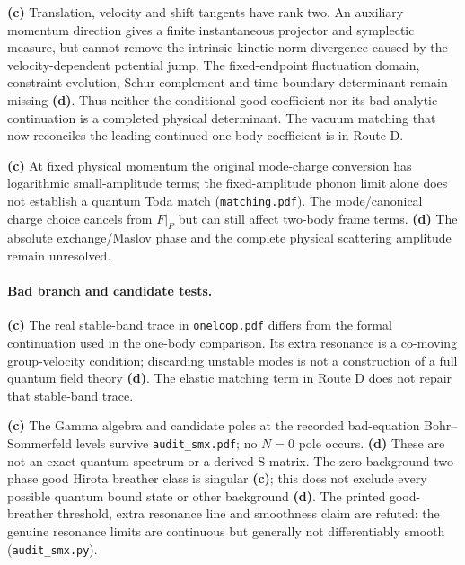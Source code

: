 \documentclass[11pt,a4paper]{article}
\newcommand{\Lc}{\textsf{\textbf{(c)}}\xspace}
\newcommand{\Ld}{\textsf{\textbf{(d)}}\xspace}
\newcommand{\file}[1]{\nolinkurl{#1}}
\theoremstyle{remark}\newtheorem{remark}[proposition]{Remark}
\begin{document}
\Lc Translation, velocity and shift tangents have rank two. An auxiliary
momentum direction gives a finite instantaneous projector and symplectic
measure, but cannot remove the intrinsic kinetic-norm divergence caused by
the velocity-dependent potential jump. The fixed-endpoint fluctuation domain,
constraint evolution, Schur complement and time-boundary determinant remain
missing \Ld. Thus neither the conditional good coefficient nor its bad analytic
continuation is a completed physical determinant. The vacuum matching that now
reconciles the leading continued one-body coefficient is in Route D.

\Lc At fixed physical momentum the original mode-charge conversion has
logarithmic small-amplitude terms; the fixed-amplitude phonon limit alone does
not establish a quantum Toda match (\file{matching.pdf}). The mode/canonical
charge choice cancels from $F|_P$ but can still affect two-body frame terms.
\Ld The absolute exchange/Maslov phase and the complete physical scattering
amplitude remain unresolved.

\paragraph{Bad branch and candidate tests.}
\Lc The real stable-band trace in \file{oneloop.pdf} differs from the formal
continuation used in the one-body comparison. Its extra resonance is a
co-moving group-velocity condition; discarding unstable modes is not a
construction of a full quantum field theory \Ld. The elastic matching term in
Route D does not repair that stable-band trace.

\Lc The Gamma algebra and candidate poles at the recorded bad-equation
Bohr--Sommerfeld levels survive \file{audit_smx.pdf}; no $N=0$ pole occurs.
\Ld These are not an exact quantum spectrum or a derived S-matrix. The
zero-background two-phase good Hirota breather class is singular \Lc; this
does not exclude every possible quantum bound state or other background \Ld.
The printed good-breather threshold, extra resonance line and smoothness claim
are refuted: the genuine resonance limits are continuous but generally not
differentiably smooth (\file{audit_smx.py}).
\end{document}
